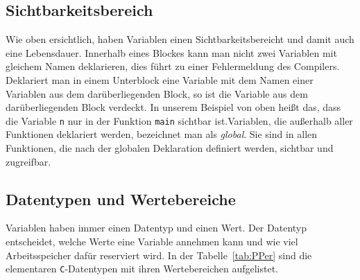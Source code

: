 \subsection{Sichtbarkeitsbereich}

Wie oben ersichtlich, haben Variablen einen Sichtbarkeitsbereicht und damit auch eine Lebensdauer.
Innerhalb eines Blockes kann man nicht zwei Variablen mit gleichem Namen deklarieren, dies führt zu einer Fehlermeldung des Compilers.
Deklariert man in einem Unterblock eine Variable mit dem Namen einer Variablen aus dem darüberliegenden Block, so ist die Variable aus dem darüberliegenden Block verdeckt.
In unserem Beispiel von oben heißt das, dass die Variable \texttt{n} nur in der Funktion \texttt{main} sichtbar ist.Variablen, die außerhalb aller Funktionen deklariert werden, bezeichnet man als \emph{global}.
Sie sind in allen Funktionen, die nach der globalen Deklaration definiert werden, sichtbar und zugreifbar.


\subsection{Datentypen und Wertebereiche}

Variablen haben immer einen Datentyp und einen Wert. 
Der Datentyp entscheidet, welche Werte eine Variable annehmen kann und wie viel Arbeitsspeicher dafür reserviert wird.
In der Tabelle~\ref{tab:PPer} sind die elementaren \texttt{C}-Datentypen mit ihren Wertebereichen aufgelistet.


